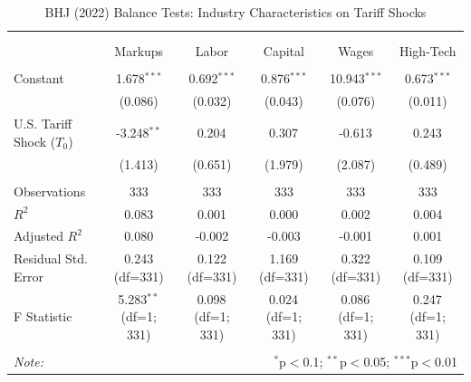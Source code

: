 \begin{table}[!htbp] \centering
  \caption{BHJ (2022) Balance Tests: Industry Characteristics on Tariff Shocks}
  \label{tab:balance_tests_stacked}
\begin{tabular}{@{\extracolsep{5pt}}lccccc}
\\[-1.8ex]\hline
\hline \\[-1.8ex]
\\[-1.8ex] & \multicolumn{1}{c}{Markups} & \multicolumn{1}{c}{Labor} & \multicolumn{1}{c}{Capital} & \multicolumn{1}{c}{Wages} & \multicolumn{1}{c}{High-Tech}  \\
\hline \\[-1.8ex]
 Constant & 1.678$^{***}$ & 0.692$^{***}$ & 0.876$^{***}$ & 10.943$^{***}$ & 0.673$^{***}$ \\
& (0.086) & (0.032) & (0.043) & (0.076) & (0.011) \\
 U.S. Tariff Shock ($T_0$) & -3.248$^{**}$ & 0.204$^{}$ & 0.307$^{}$ & -0.613$^{}$ & 0.243$^{}$ \\
& (1.413) & (0.651) & (1.979) & (2.087) & (0.489) \\
\hline \\[-1.8ex]
 Observations & 333 & 333 & 333 & 333 & 333 \\
 $R^2$ & 0.083 & 0.001 & 0.000 & 0.002 & 0.004 \\
 Adjusted $R^2$ & 0.080 & -0.002 & -0.003 & -0.001 & 0.001 \\
 Residual Std. Error & 0.243 (df=331) & 0.122 (df=331) & 1.169 (df=331) & 0.322 (df=331) & 0.109 (df=331) \\
 F Statistic & 5.283$^{**}$ (df=1; 331) & 0.098$^{}$ (df=1; 331) & 0.024$^{}$ (df=1; 331) & 0.086$^{}$ (df=1; 331) & 0.247$^{}$ (df=1; 331) \\
\hline
\hline \\[-1.8ex]
\textit{Note:} & \multicolumn{5}{r}{$^{*}$p$<$0.1; $^{**}$p$<$0.05; $^{***}$p$<$0.01} \\
\end{tabular}
\end{table}